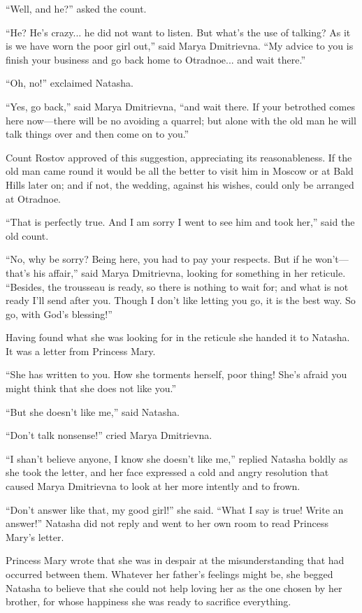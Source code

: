 ``Well, and he?'' asked the count.

``He? He's crazy... he did not want to listen. But what's the use
of talking? As it is we have worn the poor girl out,'' said Marya
Dmitrievna. ``My advice to you is finish your business and go
back home to Otradnoe... and wait there.''

``Oh, no!'' exclaimed Natasha.

``Yes, go back,'' said Marya Dmitrievna, ``and wait there. If
your betrothed comes here now---there will be no avoiding a
quarrel; but alone with the old man he will talk things over and
then come on to you.''

Count Rostov approved of this suggestion, appreciating its
reasonableness. If the old man came round it would be all the
better to visit him in Moscow or at Bald Hills later on; and if
not, the wedding, against his wishes, could only be arranged at
Otradnoe.

``That is perfectly true. And I am sorry I went to see him and
took her,'' said the old count.

``No, why be sorry? Being here, you had to pay your respects. But
if he won't---that's his affair,'' said Marya Dmitrievna, looking
for something in her reticule. ``Besides, the trousseau is ready,
so there is nothing to wait for; and what is not ready I'll send
after you. Though I don't like letting you go, it is the best
way. So go, with God's blessing!''

Having found what she was looking for in the reticule she handed
it to Natasha. It was a letter from Princess Mary.

``She has written to you. How she torments herself, poor thing!
She's afraid you might think that she does not like you.''

``But she doesn't like me,'' said Natasha.

``Don't talk nonsense!'' cried Marya Dmitrievna.

``I shan't believe anyone, I know she doesn't like me,'' replied
Natasha boldly as she took the letter, and her face expressed a
cold and angry resolution that caused Marya Dmitrievna to look at
her more intently and to frown.

``Don't answer like that, my good girl!'' she said. ``What I say
is true!  Write an answer!'' Natasha did not reply and went to
her own room to read Princess Mary's letter.

Princess Mary wrote that she was in despair at the
misunderstanding that had occurred between them. Whatever her
father's feelings might be, she begged Natasha to believe that
she could not help loving her as the one chosen by her brother,
for whose happiness she was ready to sacrifice everything.

